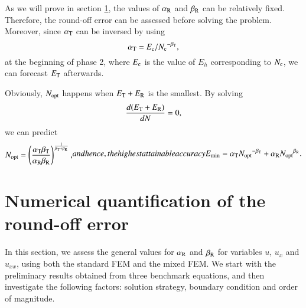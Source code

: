 \documentclass[review,3p]{elsarticle}
\begin{document}
As we will prove in section \ref{section_numerical_results_sensitivity}, the values of $\alpha_{\rm R}$ and $\beta_{\rm R}$ can be relatively fixed.
Therefore, the round-off error can be assessed before solving the problem.
Moreover, since $\alpha_{\rm T}$ can be inversed by using
\begin{equation}
 \alpha_{\rm T} = {E_{\rm c}}/{N_{\rm c}}^{- \beta_{\rm T}},		\label{formula_offset_truncation_error}
\end{equation}
at the beginning of phase 2, where ${E_{\rm c}}$ is the value of ${E_h}$ corresponding to ${N_{\rm c}}$, we can forecast $E_{\rm T}$ afterwards.


Obviously, $N_{\rm opt}$ happens when $E_{\rm T}+E_{\rm R}$ is the smallest. By solving
\begin{equation}
    \frac{d(E_{\rm T}+E_{\rm R})}{dN}=0,    \label{derivative_condition_N_opt}
\end{equation}
we can predict
\begin{subequations}
\begin{align}
 N_{\rm opt} = \left( \frac{\alpha_{\rm T} \beta_{\rm T}}{\alpha _{\rm R} \beta_{\rm R}} \right)^{\frac{1}{\beta_{\rm T} + \beta_{\rm R}}},
\end{align}
and hence, the highest attainable accuracy
\begin{align}
 E_{\rm min} = \alpha_{\rm T} {N_{\rm opt}}^{- {\beta _{\rm T}}}+\alpha_{\rm R} {N_{\rm opt}}^{{\beta _{\rm R}}}.
\end{align}
\end{subequations}

\section{Numerical quantification of the round-off error}  	\label{section_numerical_results_sensitivity}

In this section, we assess the general values for $\alpha_{\rm R}$ and $\beta_{\rm R}$ for variables $u$, $u_x$ and $u_{xx}$, using both the standard FEM and the mixed FEM.
We start with the preliminary results obtained from three benchmark equations, and then investigate the following factors: solution strategy, boundary condition and order of magnitude. 
\end{document}
